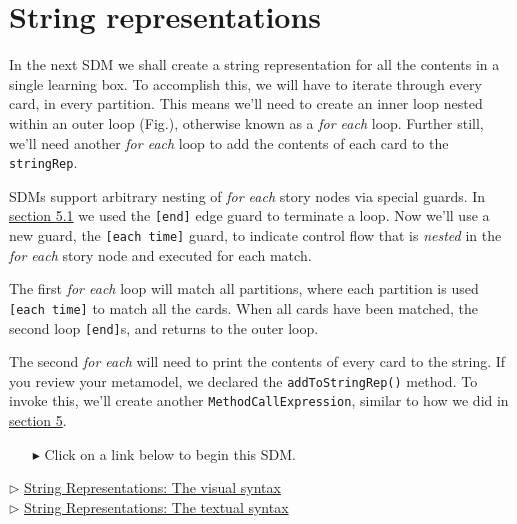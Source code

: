 \newpage
\section{String representations}
\genHeader
\hypertarget{sec:stringRep}{}

In the next SDM we shall create a string representation for all the contents in a single learning box. To accomplish this, we will have to iterate through 
every card, in every partition. This means we'll need to create an inner loop nested within an outer loop (Fig.), otherwise known as a \emph{for each} loop.
Further still, we'll need another \emph{for each} loop to add the contents of each card to the \texttt{stringRep}.


SDMs support arbitrary nesting of \emph{for each} story nodes via special guards. In \hyperlink{emptyPartition vis}{section 5.1} we used the \texttt{[end]} edge
guard to terminate a loop. Now we'll use a new guard, the \texttt{[each time]} guard, to indicate control flow that is \emph{nested} in
the \emph{for each} story node and executed for each match.

The first \emph{for each} loop will match all partitions, where each partition is used \texttt{[each time]} to match all the cards.  When 
all cards have been matched, the second loop \texttt{[end]}s, and returns to the outer loop.

The second \emph{for each} will need to print the contents of every card to the string. If you review your metamodel, we declared the \texttt{addToStringRep()}
method. To invoke this, we'll create another \texttt{MethodCallExpression}, similar to how we did in \hyperlink{sec:growBox}{section 5}.

\vspace{0.5cm}
\begin{itemize}
\item[$\blacktriangleright$] Click on a link below to begin this SDM.
\end{itemize}

\begin{center} {$\triangleright$ \hyperlink{stringRep vis}{String Representations: The visual syntax}}%
\\ \vspace{0.5cm}
{$\triangleright$ \hyperlink{stringRep tex}{String Representations: The textual syntax}}\end{center} 
 



